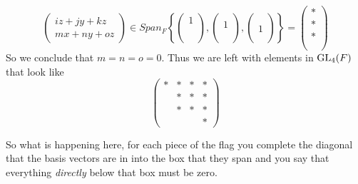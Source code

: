 \begin{example}[\(\GL_n\)]
\begin{example}
\[\begin{pmatrix}
            iz+jy+kz\\
            mx+ny+oz
        \end{pmatrix} \in Span_F\left\{\begin{pmatrix}
            1 \\
            \\
            \\
            \\
        \end{pmatrix}, \begin{pmatrix}
             \\
            1\\
            \\
            \\
        \end{pmatrix}, \begin{pmatrix}
             \\
            \\
            1\\
            \\
        \end{pmatrix}\right\} =\begin{pmatrix}
            *\\
            *\\
            *\\
            \\
        \end{pmatrix} \]
        So we conclude that \(m = n = o = 0\). Thus we are left with elements in \(\GL_4(F)\) that look like
        \[\begin{pmatrix}
            * & *&*&*\\
            & *&*&*\\
            &*&*&*\\
            &&&*
        \end{pmatrix}\]

    \end{example}
    So what is happening here, for each piece of the flag you complete the diagonal that the basis vectors are in into the box that they span and you say that everything \textit{directly} below that box must be zero. 
    




    \begin{tikzpicture}[x=0.75pt,y=0.75pt,yscale=-1,xscale=1]
    

\end{tikzpicture}
\end{example}
